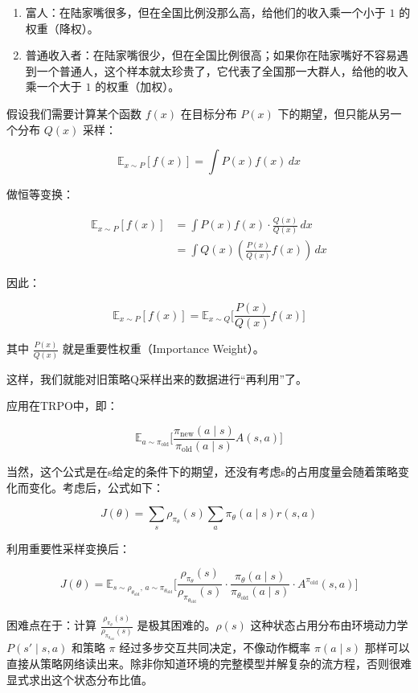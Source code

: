 \begin{enumerate}
\def\labelenumi{\arabic{enumi}.}
\tightlist
\item
  富人：在陆家嘴很多，但在全国比例没那么高，给他们的收入乘一个小于 \(1\) 的权重（降权）。
\item
  普通收入者：在陆家嘴很少，但在全国比例很高；如果你在陆家嘴好不容易遇到一个普通人，这个样本就太珍贵了，它代表了全国那一大群人，给他的收入乘一个大于 \(1\) 的权重（加权）。
\end{enumerate}

假设我们需要计算某个函数 \(f(x)\) 在目标分布 \(P(x)\) 下的期望，但只能从另一个分布 \(Q(x)\) 采样：

\[
\mathbb{E}_{x\sim P}[f(x)] = \int P(x)f(x)\,dx
\]

做恒等变换：

\[
\begin{aligned}
\mathbb{E}_{x\sim P}[f(x)]
&= \int P(x)f(x)\cdot \frac{Q(x)}{Q(x)}\,dx \\
&= \int Q(x)(\frac{P(x)}{Q(x)}f(x))\,dx
\end{aligned}
\]

因此：

\[
\mathbb{E}_{x\sim P}[f(x)]
=
\mathbb{E}_{x\sim Q}
\bigl[
\frac{P(x)}{Q(x)}f(x)
\bigr]
\]

其中 \(\frac{P(x)}{Q(x)}\) 就是重要性权重（Importance Weight）。

这样，我们就能对旧策略Q采样出来的数据进行``再利用''了。

应用在TRPO中，即：

\[
\mathbb{E}_{a\sim\pi_{\mathrm{old}}}
\bigl[
\frac{\pi_{\mathrm{new}}(a\mid s)}{\pi_{\mathrm{old}}(a\mid s)}
A(s,a)
\bigr]
\]

当然，这个公式是在s给定的条件下的期望，还没有考虑s的占用度量会随着策略变化而变化。考虑后，公式如下：

\[
J(\theta)=
\sum_s\rho_{\pi_\theta}(s)
\sum_a\pi_\theta(a\mid s)r(s,a)
\]

利用重要性采样变换后：

\[
J(\theta)=
\mathbb{E}_{s\sim\rho_{\theta_{\mathrm{old}}},\,a\sim\pi_{\theta_{\mathrm{old}}}}
\bigl[
\frac{\rho_{\pi_\theta}(s)}{\rho_{\pi_{\theta_{\mathrm{old}}}}(s)}
\cdot
\frac{\pi_\theta(a\mid s)}{\pi_{\theta_{\mathrm{old}}}(a\mid s)}
\cdot
A^{\pi_{\mathrm{old}}}(s,a)
\bigr]
\]

困难点在于：计算 \(\frac{\rho_{\pi_\theta}(s)}{\rho_{\pi_{\theta_{\mathrm{old}}}}(s)}\) 是极其困难的。\(\rho(s)\) 这种状态占用分布由环境动力学 \(P(s'\mid s,a)\) 和策略 \(\pi\) 经过多步交互共同决定，不像动作概率 \(\pi(a\mid s)\) 那样可以直接从策略网络读出来。除非你知道环境的完整模型并解复杂的流方程，否则很难显式求出这个状态分布比值。

